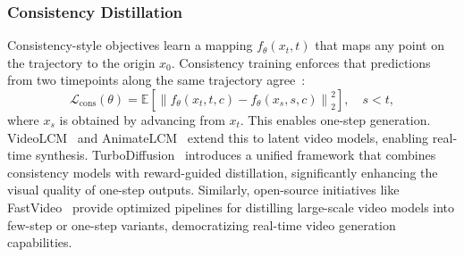 \documentclass[lettersize,journal]{IEEEtran}
\begin{document}
\subsubsection{Consistency Distillation}
Consistency-style objectives learn a mapping $f_\theta(x_t, t)$ that maps any point on the trajectory to the origin $x_0$. Consistency training enforces that predictions from two timepoints along the same trajectory agree~\cite{song2023consistency,luo2023latent}:
\begin{equation}
\mathcal{L}_{\text{cons}}(\theta)=
\mathbb{E}\left[\left\|
f_\theta(x_t,t,c)-f_\theta(x_s,s,c)
\right\|_2^2\right], \quad s<t,
\label{eq:consistency_loss}
\end{equation}
where $x_s$ is obtained by advancing from $x_t$. This enables one-step generation. VideoLCM~\cite{wang2024videolcm} and AnimateLCM~\cite{wang2024animatelcm} extend this to latent video models, enabling real-time synthesis. 
TurboDiffusion~\cite{zhang2025turbodiffusion} introduces a unified framework that combines consistency models with reward-guided distillation, significantly enhancing the visual quality of one-step outputs. Similarly, open-source initiatives like FastVideo~\cite{fastvideo2025} provide optimized pipelines for distilling large-scale video models into few-step or one-step variants, democratizing real-time video generation capabilities.
\end{document}
